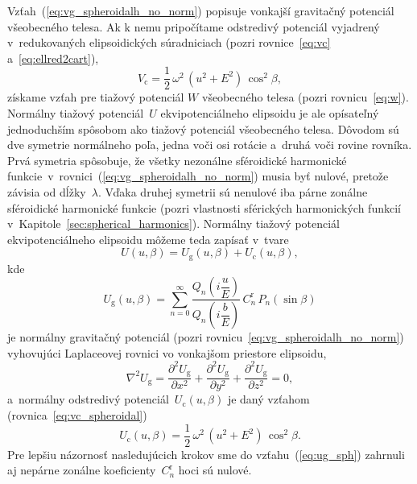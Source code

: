 \documentclass[a4paper, 12pt]{book}
\newcommand{\gidx}{\mathrm g}
\newcommand{\cidx}{\mathrm c}
\begin{document}
Vzťah~(\ref{eq:vg_spheroidalh_no_norm}) popisuje vonkajší gravitačný potenciál 
všeobecného telesa.  Ak k nemu pripočítame odstredivý potenciál vyjadrený 
v~redukovaných elipsoidických súradniciach (pozri rovnice~\ref{eq:vc} 
a~\ref{eq:ellred2cart}),
%
\begin{equation}
\label{eq:vc_spheroidal}
V_\cidx = \frac{1}{2} \, \omega^2 \, (u^2 + E^2) \, \cos^2\beta{,}
\end{equation}
%
získame vzťah pre tiažový potenciál $W$ všeobecného telesa (pozri 
rovnicu~\ref{eq:w}).  Normálny tiažový potenciál~$U$ ekvipotenciálneho 
elipsoidu je ale opísateľný jednoduchším spôsobom ako tiažový potenciál 
všeobecného telesa.  Dôvodom sú dve symetrie normálneho poľa, jedna voči osi 
rotácie a~druhá voči rovine rovníka.  Prvá symetria spôsobuje, že všetky 
nezonálne sféroidické harmonické 
funkcie~v~rovnici~(\ref{eq:vg_spheroidalh_no_norm}) musia byť nulové, pretože 
závisia od dĺžky~$\lambda$.  Vďaka druhej symetrii sú nenulové iba párne 
zonálne sféroidické harmonické funkcie (pozri vlastnosti sférických 
harmonických funkcií v~Kapitole~\ref{sec:spherical_harmonics}).  Normálny 
tiažový potenciál ekvipotenciálneho elipsoidu môžeme teda zapísať v~tvare
%
\begin{equation}
\label{eq:u_sph}
U(u, \beta) = U_\gidx(u, \beta) + U_\cidx(u, \beta){,}
\end{equation}
%
kde
%
\begin{equation}
\label{eq:ug_sph}
U_\gidx(u, \beta) = \sum_{n = 0}^\infty \frac{Q_n\left( i \dfrac{u}{E} 
\right)}{Q_n\left( i \dfrac{b}{E} \right)} \,  C^{\mathrm{r}}_n \, 
P_n(\sin\beta)
\end{equation}
%
je normálny gravitačný potenciál (pozri 
rovnicu~\ref{eq:vg_spheroidalh_no_norm}) vyhovujúci Laplaceovej rovnici vo 
vonkajšom priestore elipsoidu,
%
\begin{equation}
\label{eq:ug_laplace_cart}
\nabla^2 U_\gidx = \frac{\partial^2 U_\gidx}{\partial x^2} + \frac{\partial^2 
U_\gidx}{\partial y^2} + \frac{\partial^2 U_\gidx}{\partial z^2} = 0{,}
\end{equation}
%
a~normálny odstredivý potenciál~$U_\cidx(u, \beta)$ je daný vzťahom 
(rovnica~\ref{eq:vc_spheroidal})
%
\begin{equation}
\label{eq:uc_sph}
U_\cidx(u, \beta) = \frac{1}{2} \, \omega^2 \, (u^2 + E^2) \, \cos^2\beta{.}
\end{equation}
%
Pre lepšiu názornosť nasledujúcich krokov sme do vzťahu~(\ref{eq:ug_sph}) 
zahrnuli aj nepárne zonálne koeficienty~$C^{\mathrm{r}}_n$ hoci sú nulové.
\end{document}
